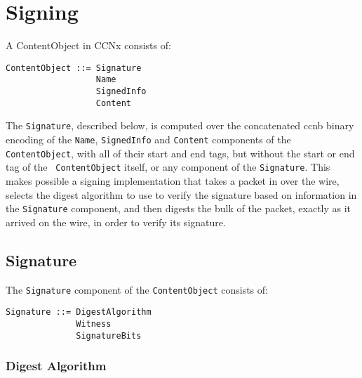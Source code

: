 \section{Signing}
\label{sec:Signing}

A ContentObject in CCNx consists of:

\begin{verbatim}
ContentObject ::= Signature
                  Name
                  SignedInfo
                  Content
\end{verbatim}

The {\tt Signature}, described below, is computed over the
concatenated ccnb binary encoding of the {\tt Name}, {\tt SignedInfo}
and {\tt Content} components of the {\tt ContentObject}, with all of
their start and end tags, but without the start or end tag of the {\tt
  ContentObject} itself, or any component of the {\tt Signature}. This
makes possible a signing implementation that takes a packet in over
the wire, selects the digest algorithm to use to verify the signature
based on information in the {\tt Signature} component, and then
digests the bulk of the packet, exactly as it arrived on the wire, in
order to verify its signature.


\subsection{Signature}

The {\tt Signature} component of the {\tt ContentObject} consists of:

\begin{verbatim}
Signature ::= DigestAlgorithm
              Witness
              SignatureBits
\end{verbatim}


\subsubsection{Digest Algorithm}

